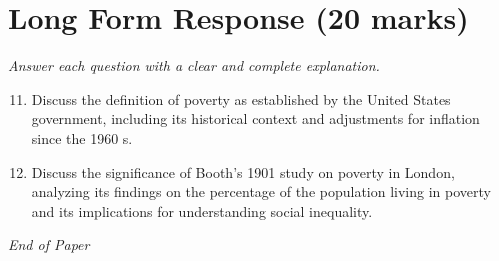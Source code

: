 \documentclass[12pt]{article}
\begin{document}
\section*{Long Form Response (20 marks)}
\textit{Answer each question with a clear and complete explanation.}
\begin{enumerate}[label=\arabic*.]
\setcounter{enumi}{10}
\item Discuss the definition of poverty as established by the United States government, including its historical context and adjustments for inflation since the 1960 s.
\item Discuss the significance of Booth's 1901 study on poverty in London, analyzing its findings on the percentage of the population living in poverty and its implications for understanding social inequality.
\end{enumerate}

\vfill
\noindent\textit{End of Paper}
\end{document}
